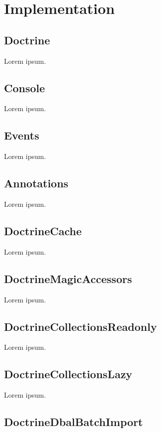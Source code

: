 \chapter{Implementation}

\section{Doctrine}

Lorem ipsum.

\section{Console}

Lorem ipsum.

\section{Events}

Lorem ipsum.

\section{Annotations}

Lorem ipsum.

\section{DoctrineCache}

Lorem ipsum.

\section{DoctrineMagicAccessors}

Lorem ipsum.

\section{DoctrineCollectionsReadonly}

Lorem ipsum.

\section{DoctrineCollectionsLazy}

Lorem ipsum.

\section{DoctrineDbalBatchImport}

